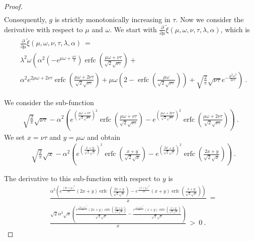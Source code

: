 \documentclass{article}
\newcommand\xinn{{\tilde \xi}}
\DeclareMathOperator{\erfc}{erfc}
\begin{document}
\begin{proof}
\begin{align}
\end{align}
Consequently, $g$ is strictly monotonically increasing in $\tau$.
Now we consider the derivative with respect to $\mu$ and $\omega$. We start with $\frac{\partial }{\partial \mu }
\xinn(\mu,\omega,\nu,\tau,\lambda ,\alpha )$, 
which is
\begin{align}
\label{eq:J21New}
&\frac{\partial }{\partial \mu } \xinn(\mu,\omega,\nu,\tau,\lambda ,\alpha )\ = \\ \nonumber &\lambda ^2 \omega \left(\alpha ^2 \left(-e^{\mu
      \omega+\frac{\nu \tau}{2}}\right)
  \erfc\left(\frac{\mu \omega+\nu \tau}{\sqrt{2}
      \sqrt{\nu \tau}}\right)+\right. \\ \nonumber
&\left. \alpha ^2 e^{2 \mu \omega+2
    \nu \tau} \erfc\left(\frac{\mu \omega+2
      \nu \tau}{\sqrt{2} \sqrt{\nu
        \tau}}\right)+\mu \omega
  \left(2-\erfc\left(\frac{\mu \omega}{\sqrt{2} \sqrt{\nu
          \tau}}\right)\right)+\sqrt{\frac{2}{\pi }}
  \sqrt{\nu \tau} e^{-\frac{\mu^2 \omega^2}{2 \nu
      \tau}}\right)\ .
\end{align}

We consider the sub-function
\begin{align}
\sqrt{\frac{2}{\pi }} \sqrt{\nu \tau}-\alpha ^2
  \left(e^{\left(\frac{\mu \omega+\nu \tau}{\sqrt{2}
  \sqrt{\nu \tau}}\right)^2}
  \erfc\left(\frac{\mu \omega+\nu \tau}{\sqrt{2}
  \sqrt{\nu \tau}}\right)-e^{\left(\frac{\mu \omega+2
  \nu \tau}{\sqrt{2} \sqrt{\nu \tau}}\right)^2}
  \erfc\left(\frac{\mu \omega+2 \nu \tau}{\sqrt{2}
  \sqrt{\nu \tau}}\right)\right) \ .
\end{align}
We set $x=\nu\tau$ and $y=\mu \omega$ and obtain
\begin{align}
& \sqrt{\frac{2}{\pi }} \sqrt{x}-\alpha ^2
  \left(e^{\left(\frac{x+y}{\sqrt{2} \sqrt{x}}\right)^2}
  \erfc\left(\frac{x+y}{\sqrt{2}
  \sqrt{x}}\right)-e^{\left(\frac{2 x+y}{\sqrt{2} \sqrt{x}}\right)^2}
  \erfc\left(\frac{2 x+y}{\sqrt{2} \sqrt{x}}\right)\right) \ .
\end{align}

The derivative to this sub-function with respect to $y$ is
\begin{align}
&\frac{\alpha ^2 \left(e^{\frac{(2 x+y)^2}{2 x}} (2 x+y)
   \erfc\left(\frac{2 x+y}{\sqrt{2}
   \sqrt{x}}\right)-e^{\frac{(x+y)^2}{2 x}} (x+y)
   \erfc\left(\frac{x+y}{\sqrt{2} \sqrt{x}}\right)\right)}{x} \ = \\ \nonumber 
&\frac{\sqrt{2} \alpha ^2 \sqrt{x} \left(\frac{e^{\frac{(2 x+y)^2}{2 x}} (2 x+y) \erfc\left(\frac{2 x+y}{\sqrt{2} \sqrt{x}}\right)}{\sqrt{2} \sqrt{x}}
   -\frac{e^{\frac{(x+y)^2}{2 x}} (x+y) \erfc\left(\frac{x+y}{\sqrt{2} \sqrt{x}}\right)}{\sqrt{2} \sqrt{x}}\right)}{x}\ >\ 0 \ .
\end{align}


\end{proof}
\end{document}
